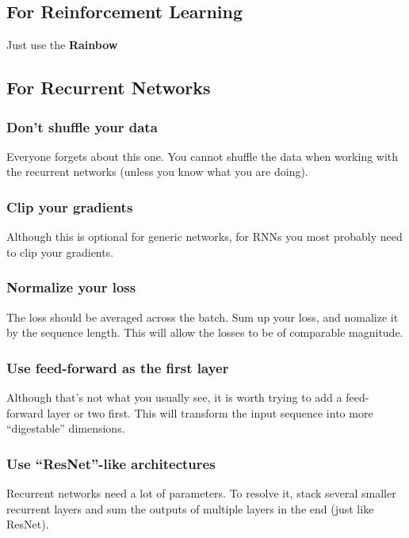 \subsection{For Reinforcement Learning}
Just use the {\bf Rainbow}\cite{hessel:arxiv:2017}

\subsection{For Recurrent Networks}

\subsubsection*{Don't shuffle your data}
Everyone forgets about this one.
You cannot shuffle the data when working with the recurrent networks (unless you know what you are doing).

\subsubsection*{Clip your gradients}
Although this is optional for generic networks, for RNNs you most probably need to clip your gradients.

\subsubsection*{Normalize your loss}
The loss should be averaged across the batch.
Sum up your loss, and nomalize it by the sequence length.
This will allow the losses to be of comparable magnitude.

\subsubsection*{Use feed-forward as the first layer}
Although that's not what you usually see, it is worth trying to add a feed-forward layer or two first.
This will transform the input sequence into more ``digestable'' dimensions.

\subsubsection*{Use ``ResNet''-like architectures}
Recurrent networks need a lot of parameters.
To resolve it, stack several smaller recurrent layers and sum the outputs of multiple layers in the end (just like ResNet).

